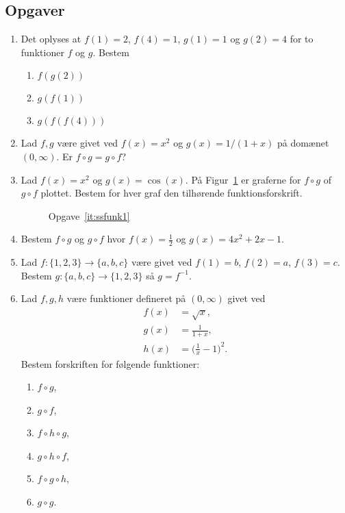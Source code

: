 \subsection{Opgaver}

\begin{enumerate}
	
	\item Det oplyses at $f(1)=2$, $f(4)=1$, $g(1)=1$ og $g(2)=4$ for to funktioner $f$ og $g$. Bestem
	\begin{enumerate}
		\item $f(g(2))$
		\item $g(f(1))$
		\item $g(f(f(4)))$
	\end{enumerate}
	
	\item Lad $f,g$ være givet ved $f(x)=x^2$ og $g(x)=1/(1+x)$ på domænet $(0,\infty)$. Er $f\circ g=g\circ f$? 
	
	\item \label{it:ssfunk1} Lad $f(x)=x^2$ og $g(x)=\cos(x)$. På Figur~\ref{fig:ssfunk1} er graferne for $f\circ g$ of $g\circ f$ plottet. Bestem for hver graf den tilhørende funktionsforskrift.
	
	\begin{figure}
		\centering
		\caption{Opgave~\ref{it:ssfunk1}}
		\label{fig:ssfunk1}
	\end{figure}
	
	\item Bestem $f\circ g$ og $g\circ f$ hvor $f(x)=\frac{1}{2}$ og $g(x)=4x^2+2x-1$.
	
	\item Lad $f\colon \{1,2,3\}\to \{a,b,c\}$ være givet ved $f(1)=b$, $ f(2)=a $, $ f(3)=c $. Bestem $g\colon \{a,b,c\}\to \{1,2,3\}$ så $g=f^{-1}$.
	
	\item Lad $f,g,h$ være funktioner defineret på $(0,\infty)$ givet ved
	\begin{align*}
	f(x)&=\sqrt{x},\\
	g(x)&=\frac{1}{1+x},\\
	h(x)&=\Big(\frac{1}{x}-1 \Big)^{2}.
	\end{align*}
	Bestem forskriften for følgende funktioner:
	\begin{enumerate}
		\item $f\circ g$,
		\item $g\circ f$,
		\item $f\circ h\circ g$,
		\item $g\circ h \circ f$,
		\item $ f\circ g \circ h $,
		\item $g\circ g$.
	\end{enumerate}
	

\end{enumerate}
